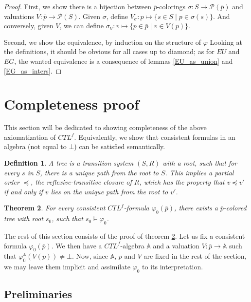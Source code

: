 \documentclass[11pt]{article}
\newcommand{\A}{{\mathbb A}}
\newtheorem{definition}{Definition}[section]
\newtheorem{theorem}[definition]{Theorem}
\begin{document}
\begin{proof}
    First, we show there is a bijection between $\bar{p}$-colorings $\sigma:S \to \mathcal{P}(\bar{p})$ and valuations $V:\bar{p}\to \mathcal{P}(S)$. Given $\sigma$, define $V_\sigma: p\mapsto\{s\in S \mid p\in \sigma(s)\}$. And conversely, given $V$, we can define $\sigma_V: v\mapsto\{p\in\bar{p}\mid v\in V(p)\}$.

    Second, we show the equivalence, by induction on the structure of $\varphi$ Looking at the definitions, it should be obvious for all cases up to diamond; as for $EU$ and $EG$, the wanted equivalence is a consequence of lemmas \ref{EU_as_union} and \ref{EG_as_inters}.
\end{proof}
\section{Completeness proof}\label{sec:compl}    

This section will be dedicated to showing completeness of the above axiomatization of $CTL^f$. Equivalently, we show that consistent formulas in an algebra (not equal to $\bot$) can be satisfied semantically.

\begin{definition}\label{tree}
    A \emph{tree} is a transition system $(S,R)$ with a \emph{root}, such that for every $s$ in $S$, there is a unique path from the root to $S$. This implies a partial order $\preceq$, the reflexive-transitive closure of $R$, which has the property that $v\preceq v'$ if and only if $v$ lies on the unique path from the root to $v'$.
\end{definition}

\begin{theorem}\label{completeness}
    For every \emph{consistent} $CTL^f$-formula $\varphi_0(\bar{p})$, there exists a $\bar{p}$-colored tree with root $s_0$, such that $s_0 \models \varphi_0$.
\end{theorem}

The rest of this section consists of the proof of theorem \ref{completeness}. Let us fix a consistent formula $\varphi_0({\bar{p}})$. We then have a $CTL^f$-algebra $\A$ and a valuation $V:\bar{p}\to \A$ such that $\varphi_0^\A(V(\bar{p}))\neq\bot$. Now, since $\A$, $\bar{p}$ and $V$ are fixed in the rest of the section, we may leave them implicit and assimilate $\varphi_0$ to its interpretation.

\subsection*{Preliminaries}
\end{document}
